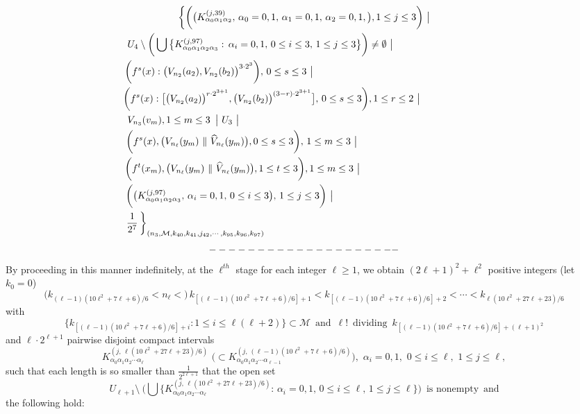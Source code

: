 \documentclass[12pt]{article}
\newcommand{\al}{\alpha}
\begin{document}
\begin{multline*}
$$
\bigg\{ \bigg(\big(K_{\al_0\al_1\al_2}^{(j,39)}, \, \al_0 = 0, 1, \, \al_1 = 0, 1, \, \al_2 = 0, 1, \big), 1 \le j \le 3 \bigg) \,\, \big| \\ 
\,U_4 \setminus \bigg( \bigcup \big\{ K_{\al_0\al_1\al_2\al_3}^{(j,97)}: \, \al_i = 0, 1, \, 0 \le i \le 3, \, 1 \le j \le 3 \big\} \bigg) \ne \emptyset \,\, \big| \qquad \qquad\qquad\quad\quad\,\,\,\,\,\,\, \\ 
\quad\quad \bigg(f^s(x) : \big(V_{n_2}(a_2), V_{n_2}(b_2)\big)^{3 \cdot 2^3}\bigg), \, 0 \le s \le 3 \,\, \big| \qquad\qquad\qquad\qquad\qquad\qquad\qquad\qquad\qquad\quad\,\,\, \\
\,\,\, \bigg(f^s(x) : \big[\big(V_{n_2}(a_2)\big)^{r \cdot 2^{3+1}}, \big(V_{n_2}(b_2)\big)^{(3-r) \cdot 2^{3+1}}\big], \, 0 \le s \le 3\bigg), 1 \le r \le 2 \,\, \big| \qquad\qquad\quad\quad\,\,\,\,\,\,\, \\  
\, V_{n_3}(v_m), 1 \le m \le 3 \,\,\, \big| \,\, U_3 \,\, \big| \qquad\qquad\qquad\qquad\qquad\qquad\qquad\qquad\qquad\qquad\qquad\qquad\quad \\
\bigg(f^{s}(x), \big(V_{n_\ell}(y_m) \,\, \| \,\, \widehat V_{n_\ell}(y_m)\big), 0 \le s \le 3\bigg), \, 1 \le m \le 3 \,\, \big| \qquad\qquad\qquad\qquad\qquad\qquad\,\,\,\,\, \\ 
\bigg(f^t(x_m), \big(V_{n_\ell}(y_m) \,\, \| \,\, \widehat V_{n_\ell}(y_m)\big), 1 \le t \le 3 \bigg), 1 \le m \le 3 \,\, \big| \qquad\qquad\qquad\qquad\qquad\qquad\,\,\,\, \\ 
\,\,\,\, \bigg(\big(K_{\al_0\al_1\al_2\al_3}^{(j,97)}, \, \al_i = 0,1, \, 0 \le i \le 3 \big), \, 1 \le j \le 3\bigg) \,\, \big| \qquad\qquad\qquad\qquad\qquad\qquad\qquad\qquad \\
\frac 1{2^7} \, \bigg\}_{(n_3, \mathcal M, k_{40}, k_{41}, j_{42}, \cdots, k_{95}, k_{96}, k_{97})} \quad\quad\,\,\qquad\qquad\qquad\qquad\qquad\qquad\qquad\qquad\qquad\qquad
\end{multline*}
$$--------------------\vspace{.1in}$$
\indent By proceeding in this manner indefinitely, at the $\ell^{th}$ stage for each integer $\ell \ge 1$, we obtain $(2\ell+1)^2+\ell^2$ positive integers (let $k_0 = 0$)
$$
\big(k_{(\ell-1)(10\ell^2+7\ell+6)/6} < n_\ell <\big) \, k_{[(\ell-1)(10\ell^2+7\ell+6)/6]+1} < k_{[(\ell-1)(10\ell^2+7\ell+6)/6]+2} < \cdots < k_{\ell(10\ell^2+27\ell+23)/6}
$$ 
with 
$$
\big\{ k_{[(\ell-1)(10\ell^2+7\ell+6)/6]+i}: 1 \le i \le \ell(\ell+2) \big\} \subset \mathcal M \,\,\, \text{and} \,\,\, {\ell}! \,\,\, \text{dividing} \,\,\, k_{[(\ell-1)(10\ell^2+7\ell+6)/6]+(\ell+1)^2} 
$$ 
and $\ell \cdot 2^{\ell+1}$ pairwise disjoint compact intervals 
$$
K_{\al_0\al_1\al_2\cdots \al_\ell}^{(j, \,\ell(10\ell^2+27\ell+23)/6)} \,\, \big(\subset K_{\al_0\al_1\al_2\cdots \al_{\ell-1}}^{(j,\, (\ell-1)(10\ell^2+7\ell+6)/6)}\big), \,\, \al_i = 0, 1, \,\, 0 \le i \le \ell, \,\, 1 \le j \le \ell,
$$ 
such that each length is so smaller than $\frac 1{2^{2\ell+1}}$ that the open set 
$$
U_{\ell+1} \setminus \ \bigg( \bigcup \big\{ K_{\al_0\al_1\al_2\cdots \al_\ell}^{(j,\,\ell(10\ell^2+27\ell+23)/6)}: \, \al_i = 0, 1, \, 0 \le i \le \ell, \, 1 \le j \le \ell \big\} \bigg) \,\,\, \text{is nonempty} \,\,\, \text{and}
$$
the following hold:
\end{document}
